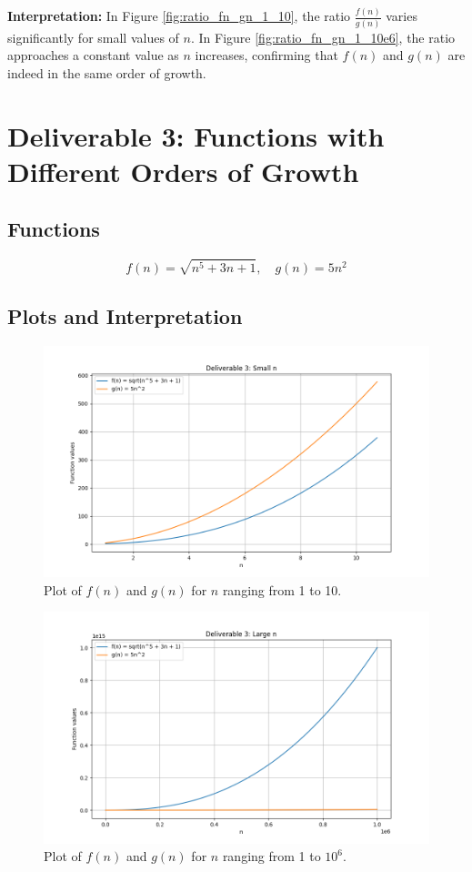 \documentclass{article}
\begin{document}
\textbf{Interpretation:} In Figure \ref{fig:ratio_fn_gn_1_10}, the ratio $\frac{f(n)}{g(n)}$ varies significantly for small values of $n$. In Figure \ref{fig:ratio_fn_gn_1_10e6}, the ratio approaches a constant value as $n$ increases, confirming that $f(n)$ and $g(n)$ are indeed in the same order of growth.

\section{Deliverable 3: Functions with Different Orders of Growth}

\subsection{Functions}
\[
f(n) = \sqrt{n^5 + 3n + 1}, \quad g(n) = 5n^2
\]

\subsection{Plots and Interpretation}

\begin{figure}[H]
    \centering
    \includegraphics[width=\textwidth]{plot_deliverable3_smalln.png}
    \caption{Plot of $f(n)$ and $g(n)$ for $n$ ranging from 1 to 10.}
    \label{fig:fn2_gn2_1_10}
\end{figure}

\begin{figure}[H]
    \centering
    \includegraphics[width=\textwidth]{plot_deliverable3_largen.png}
    \caption{Plot of $f(n)$ and $g(n)$ for $n$ ranging from 1 to $10^6$.}
    \label{fig:fn2_gn2_1_10e6}
\end{figure}
\end{document}
